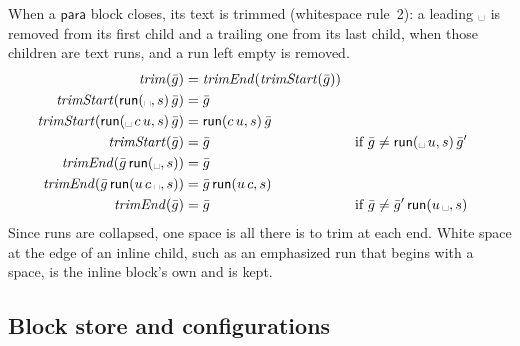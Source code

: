 \documentclass[11pt]{article}
\numberwithin{equation}{section}
\newcommand{\kw}[1]{\ensuremath{\mathsf{#1}}}
\newcommand{\vs}{\text{\textvisiblespace}}
\begin{document}
When a $\kw{para}$ block closes, its text is trimmed (whitespace rule~2):
a leading $\vs$ is removed from its first child and a
trailing one from its last child, when those children are text runs, and
a run left empty is removed.
\begin{equation}\label{eq:trim}
\begin{aligned}
\mathit{trim}(\bar g) &= \mathit{trimEnd}(\mathit{trimStart}(\bar g)) \\
\mathit{trimStart}(\kw{run}(\vs, s)\,\bar g) &= \bar g \\
\mathit{trimStart}(\kw{run}(\vs\,c\,u, s)\,\bar g) &=
  \kw{run}(c\,u, s)\,\bar g \\
\mathit{trimStart}(\bar g) &= \bar g
  && \text{if } \bar g \neq \kw{run}(\vs\,u, s)\,\bar g' \\
\mathit{trimEnd}(\bar g\,\kw{run}(\vs, s)) &= \bar g \\
\mathit{trimEnd}(\bar g\,\kw{run}(u\,c\,\vs, s)) &=
  \bar g\,\kw{run}(u\,c, s) \\
\mathit{trimEnd}(\bar g) &= \bar g
  && \text{if } \bar g \neq \bar g'\,\kw{run}(u\,\vs, s)
\end{aligned}
\end{equation}
Since runs are collapsed, one space is all there is to trim at each end.
White space at the edge of an inline child, such as an emphasized run that
begins with a space, is the inline block's own and is kept.

\subsection{Block store and configurations}
\end{document}

